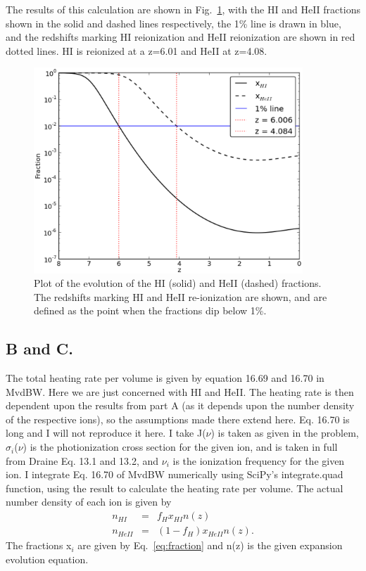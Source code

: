 \documentclass[a4paper]{article}
\begin{document}
The results of this calculation are shown in Fig.~\ref{fig:fraction},
with the HI and HeII fractions shown in the solid and dashed lines respectively,
the 1\% line is drawn in blue, and the redshifts marking HI reionization 
and HeII reionization are shown in red dotted lines. HI is reionized at 
a z=6.01 and HeII at z=4.08.

\begin{figure}
\centering
\includegraphics[width=0.9\textwidth]{./../../IGM/xHI_xHe.eps}
\caption{Plot of the evolution of the HI (solid) and HeII (dashed) fractions.
The redshifts
marking HI and HeII re-ionization are shown, and are defined as the point
when the fractions dip below 1\%.}
\label{fig:fraction}
\end{figure}

\subsection{B and C.}
The total heating rate per volume is given by equation 16.69 and 16.70 in
MvdBW. Here we are just concerned with HI and HeII. The heating rate is then
dependent upon the results from part A (as it depends upon the number density
of the respective ions), so the assumptions made there extend here. Eq. 16.70 
is long and I will not reproduce it here. I take J($\nu$) is taken as given
in the problem, $\sigma_i$($\nu$) is the photionization cross section for the 
given ion, and is taken in full from Draine Eq. 13.1 and 13.2, and $\nu_i$ is 
the ionization frequency for the given ion. I integrate Eq. 16.70 of MvdBW numerically
using SciPy's integrate.quad function, using the result to calculate the 
heating rate per volume. The actual number density of each ion is given by
\begin{eqnarray}
n_{HI} &=& f_H x_{HI} n(z)\\
n_{HeII} &=& (1-f_H) x_{HeII} n(z).
\end{eqnarray}
The fractions x$_{i}$ are given by Eq.~\ref{eq:fraction} and n(z) is the given
expansion evolution equation. 
\end{document}
